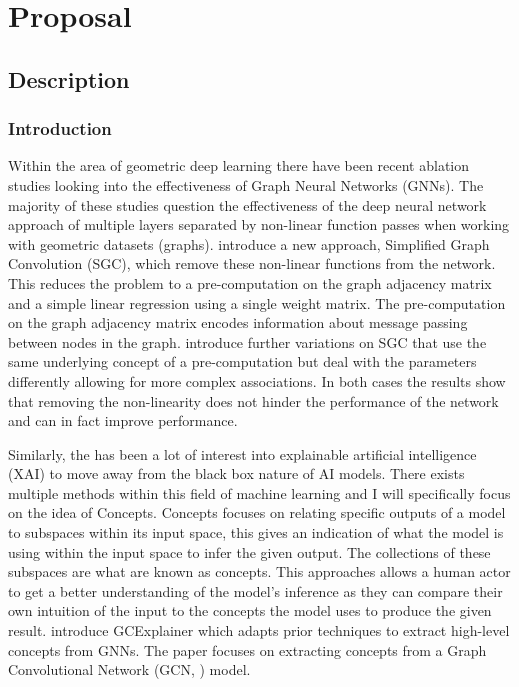 \chapter{Proposal}
\label{ch:proposal}
\section{Description}

\subsection{Introduction}

Within the area of geometric deep learning there have been recent ablation studies looking into the effectiveness of Graph Neural Networks (GNNs). The majority of these studies question the effectiveness of the deep neural network approach of multiple layers separated by non-linear function passes when working with geometric datasets (graphs). \cite{wu2019simplifying} introduce a new approach, Simplified Graph Convolution (SGC), which remove these non-linear functions from the network. This reduces the problem to a pre-computation on the graph adjacency matrix and a simple linear regression using a single weight matrix. The pre-computation on the graph adjacency matrix encodes information about message passing between nodes in the graph.  \cite{chanpuriya2022simplified} introduce further variations on SGC that use the same underlying concept of a pre-computation but deal with the parameters differently allowing for more complex associations. In both cases the results show that removing the non-linearity does not hinder the performance of the network and can in fact improve performance.

Similarly, the has been a lot of interest into explainable artificial intelligence (XAI) to move away from the black box nature of AI models. There exists multiple methods within this field of machine learning and I will specifically focus on the idea of Concepts. Concepts focuses on relating specific outputs of a model to subspaces within its input space, this gives an indication of what the model is using within the input space to infer the given output. The collections of these subspaces are what are known as concepts. This approaches allows a human actor to get a better understanding of the model's inference as they can compare their own intuition of the input to the concepts the model uses to produce the given result.
\cite{magister2021gcexplainer} introduce GCExplainer which adapts prior techniques to extract high-level concepts from GNNs. The paper focuses on extracting concepts from a Graph Convolutional Network (GCN, \cite{kipf2016semi}) model.

